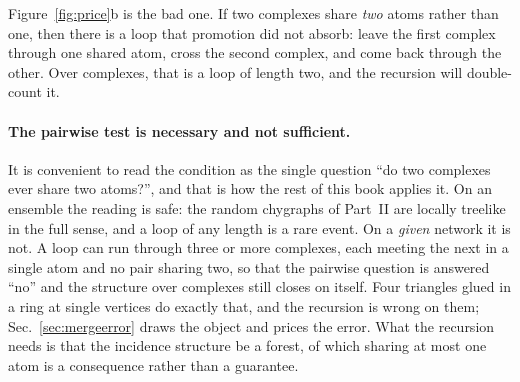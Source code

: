 Figure~\ref{fig:price}b is the bad one. If two complexes share \emph{two} atoms
rather than one, then there is a loop that promotion did not absorb: leave the
first complex through one shared atom, cross the second complex, and come back
through the other. Over complexes, that is a loop of length two, and the
recursion will double-count it.

\paragraph{The pairwise test is necessary and not sufficient.} It is convenient
to read the condition as the single question ``do two complexes ever share two
atoms?'', and that is how the rest of this book applies it. On an ensemble the
reading is safe: the random chygraphs of Part~II are locally treelike in the
full sense, and a loop of any length is a rare event. On a \emph{given} network
it is not. A loop can run through three or more complexes, each meeting the next
in a single atom and no pair sharing two, so that the pairwise question is
answered ``no'' and the structure over complexes still closes on itself. Four
triangles glued in a ring at single vertices do exactly that, and the recursion
is wrong on them; Sec.~\ref{sec:mergeerror} draws the object and prices the
error. What the recursion needs is that the incidence structure be a forest, of
which sharing at most one atom is a consequence rather than a guarantee.

